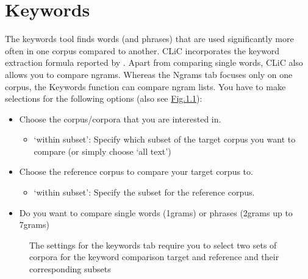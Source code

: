\documentclass[letterpaper,10pt,english]{sphinxmanual}
\begin{document}
\chapter{Keywords}
\label{\detokenize{clicanalysis/keywords:keywords}}\label{\detokenize{clicanalysis/keywords:id1}}\label{\detokenize{clicanalysis/keywords::doc}}
\sphinxAtStartPar
The keywords tool finds words (and phrases) that are used significantly
more often in one corpus compared to another. CLiC incorporates the
keyword extraction formula reported by . Apart
from comparing single words, CLiC also allows you to compare n\sphinxhyphen{}grams.
Whereas the N\sphinxhyphen{}grams tab focuses only on one corpus, the Keywords
function can compare n\sphinxhyphen{}gram lists. You have to make selections for the
following options (also see
\hyperref[\detokenize{clicanalysis/keywords:figure-analysis-keywords-settings}]{Fig.\@ \ref{\detokenize{clicanalysis/keywords:figure-analysis-keywords-settings}}}):
\begin{itemize}
\item {} 
\sphinxAtStartPar
{} Choose the corpus/corpora that you are
interested in.
\begin{itemize}
\item {} 
\sphinxAtStartPar
‘within subset’: Specify which subset of the target corpus you
want to compare (or simply choose ‘all text’)

\end{itemize}

\item {} 
\sphinxAtStartPar
{} Choose the reference corpus to compare your
target corpus to.
\begin{itemize}
\item {} 
\sphinxAtStartPar
‘within subset’: Specify the subset for the reference corpus.

\end{itemize}

\item {} 
\sphinxAtStartPar
{} Do you want to compare single words (1\sphinxhyphen{}grams) or
phrases (2\sphinxhyphen{}grams up to 7\sphinxhyphen{}grams)

\end{itemize}

\begin{figure}[htbp]
\centering
\capstart

\noindent{}
\caption{The settings for the keywords tab require you to select
two sets of corpora for the keyword comparison \textendash{} target and reference
\textendash{} and their corresponding subsets}\label{\detokenize{clicanalysis/keywords:id4}}\label{\detokenize{clicanalysis/keywords:figure-analysis-keywords-settings}}\end{figure}
\end{document}

